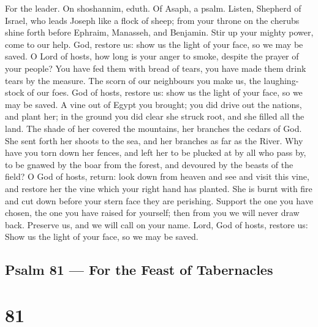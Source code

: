 For the leader. On shoshannim, eduth. Of Asaph, a psalm. 
Listen, Shepherd of Israel, who leads Joseph like a flock of sheep; from
your throne on the cherubs shine forth  before Ephraim,
Manasseh, and Benjamin. Stir up your mighty power, come to our help.
 God, restore us: show us the light of your face, so we may
be saved.  O Lord of hosts, how long is your anger to smoke,
despite the prayer of your people?  You have fed them with
bread of tears, you have made them drink tears by the measure.
 The scorn of our neighbours you make us, the laughing-stock
of our foes.  God of hosts, restore us: show us the light of
your face, so we may be saved.  A vine out of Egypt you
brought; you did drive out the nations, and plant her;  in
the ground you did clear she struck root, and she filled all the land.
 The shade of her covered the mountains, her branches the
cedars of God.  She sent forth her shoots to the sea, and
her branches as far as the River.  Why have you torn down
her fences, and left her to be plucked at by all who pass by,
 to be gnawed by the boar from the forest, and devoured by
the beasts of the field?  O God of hosts, return: look down
from heaven and see and visit this vine, and restore her 
the vine which your right hand has planted.  She is burnt
with fire and cut down before your stern face they are perishing.
 Support the one you have chosen, the one you have raised
for yourself;  then from you we will never draw back.
Preserve us, and we will call on your name.  Lord, God of
hosts, restore us: Show us the light of your face, so we may be saved.

\hypertarget{psalm-81-for-the-feast-of-tabernacles}{%
\subsection{Psalm 81 --- For the Feast of
Tabernacles}\label{psalm-81-for-the-feast-of-tabernacles}}

\hypertarget{section-80}{%
\section{81}\label{section-80}}


